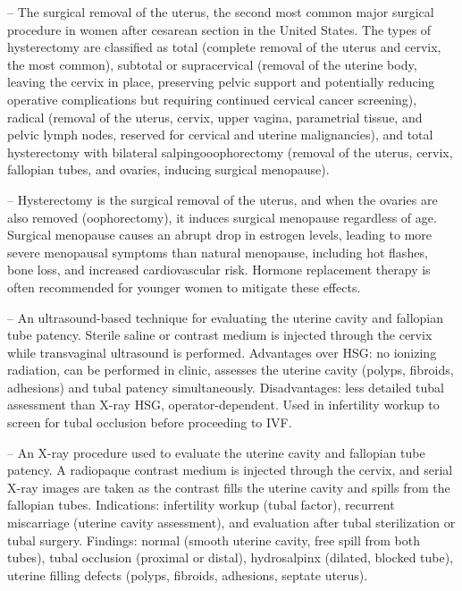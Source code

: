 -- The surgical removal of the uterus, the second most common major surgical procedure in women after cesarean section in the United States. The types of hysterectomy are classified as total (complete removal of the uterus and cervix, the most common), subtotal or supracervical (removal of the uterine body, leaving the cervix in place, preserving pelvic support and potentially reducing operative complications but requiring continued cervical cancer screening), radical (removal of the uterus, cervix, upper vagina, parametrial tissue, and pelvic lymph nodes, reserved for cervical and uterine malignancies), and total hysterectomy with bilateral salpingooophorectomy (removal of the uterus, cervix, fallopian tubes, and ovaries, inducing surgical menopause).

-- Hysterectomy is the surgical removal of the uterus, and when the ovaries are also removed (oophorectomy), it induces surgical menopause regardless of age. Surgical menopause causes an abrupt drop in estrogen levels, leading to more severe menopausal symptoms than natural menopause, including hot flashes, bone loss, and increased cardiovascular risk. Hormone replacement therapy is often recommended for younger women to mitigate these effects.

-- An ultrasound-based technique for evaluating the uterine cavity and fallopian tube patency. Sterile saline or contrast medium is injected through the cervix while transvaginal ultrasound is performed. Advantages over HSG: no ionizing radiation, can be performed in clinic, assesses the uterine cavity (polyps, fibroids, adhesions) and tubal patency simultaneously. Disadvantages: less detailed tubal assessment than X-ray HSG, operator-dependent. Used in infertility workup to screen for tubal occlusion before proceeding to IVF.

-- An X-ray procedure used to evaluate the uterine cavity and fallopian tube patency. A radiopaque contrast medium is injected through the cervix, and serial X-ray images are taken as the contrast fills the uterine cavity and spills from the fallopian tubes. Indications: infertility workup (tubal factor), recurrent miscarriage (uterine cavity assessment), and evaluation after tubal sterilization or tubal surgery. Findings: normal (smooth uterine cavity, free spill from both tubes), tubal occlusion (proximal or distal), hydrosalpinx (dilated, blocked tube), uterine filling defects (polyps, fibroids, adhesions, septate uterus).

